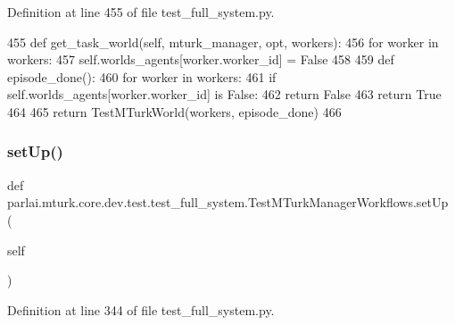Definition at line 455 of file test\+\_\+full\+\_\+system.\+py.


\begin{DoxyCode}
455     \textcolor{keyword}{def }get\_task\_world(self, mturk\_manager, opt, workers):
456         \textcolor{keywordflow}{for} worker \textcolor{keywordflow}{in} workers:
457             self.worlds\_agents[worker.worker\_id] = \textcolor{keyword}{False}
458 
459         \textcolor{keyword}{def }episode\_done():
460             \textcolor{keywordflow}{for} worker \textcolor{keywordflow}{in} workers:
461                 \textcolor{keywordflow}{if} self.worlds\_agents[worker.worker\_id] \textcolor{keywordflow}{is} \textcolor{keyword}{False}:
462                     \textcolor{keywordflow}{return} \textcolor{keyword}{False}
463             \textcolor{keywordflow}{return} \textcolor{keyword}{True}
464 
465         \textcolor{keywordflow}{return} TestMTurkWorld(workers, episode\_done)
466 
\end{DoxyCode}
\mbox{\label{classparlai_1_1mturk_1_1core_1_1dev_1_1test_1_1test__full__system_1_1TestMTurkManagerWorkflows_a97ce6f35b55b04c1615325a6f529c991}} 
\subsubsection{\texorpdfstring{set\+Up()}{setUp()}}
{\footnotesize\ttfamily def parlai.\+mturk.\+core.\+dev.\+test.\+test\+\_\+full\+\_\+system.\+Test\+M\+Turk\+Manager\+Workflows.\+set\+Up (\begin{DoxyParamCaption}\item[{}]{self }\end{DoxyParamCaption})}



Definition at line 344 of file test\+\_\+full\+\_\+system.\+py.


